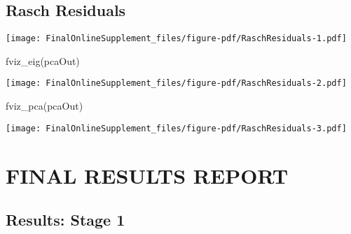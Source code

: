 \documentclass[
  letterpaper,
  DIV=11,
  numbers=noendperiod]{scrartcl}
\newenvironment{Shaded}{\begin{snugshade}}{\end{snugshade}}
\newcommand{\AttributeTok}[1]{\textcolor[rgb]{0.40,0.45,0.13}{#1}}
\newcommand{\CommentTok}[1]{\textcolor[rgb]{0.37,0.37,0.37}{#1}}
\newcommand{\FunctionTok}[1]{\textcolor[rgb]{0.28,0.35,0.67}{#1}}
\newcommand{\NormalTok}[1]{\textcolor[rgb]{0.00,0.23,0.31}{#1}}
\newcommand{\OtherTok}[1]{\textcolor[rgb]{0.00,0.23,0.31}{#1}}
\newcommand{\SpecialCharTok}[1]{\textcolor[rgb]{0.37,0.37,0.37}{#1}}
\begin{document}
\subsection{Rasch Residuals}\label{rasch-residuals}

\begin{Shaded}
\end{Shaded}

\texttt{[image: FinalOnlineSupplement\_files/figure-pdf/RaschResiduals-1.pdf]}

\begin{Shaded}
\begin{Highlighting}[]
\FunctionTok{fviz\_eig}\NormalTok{(pcaOut)}
\end{Highlighting}
\end{Shaded}

\texttt{[image: FinalOnlineSupplement\_files/figure-pdf/RaschResiduals-2.pdf]}

\begin{Shaded}
\begin{Highlighting}[]
\FunctionTok{fviz\_pca}\NormalTok{(pcaOut)}
\end{Highlighting}
\end{Shaded}

\texttt{[image: FinalOnlineSupplement\_files/figure-pdf/RaschResiduals-3.pdf]}

\section{FINAL RESULTS REPORT}\label{final-results-report}

\subsection{Results: Stage 1}\label{results-stage-1}
\end{document}
